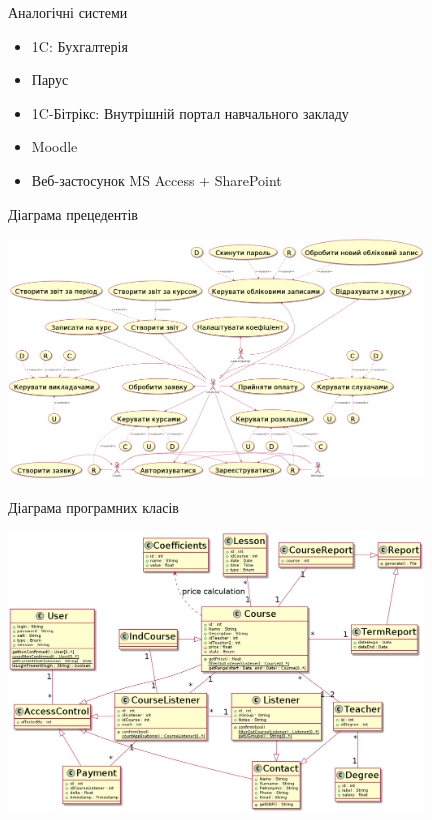 \documentclass{beamer}
\begin{document}
\begin{frame}{\fn Аналогічні системи}
\begin{itemize}
\item 1C: Бухгалтерія
\item Парус
\item 1C-Бітрікс: Внутрішній портал навчального закладу
\item Moodle
\item Веб-застосунок MS Access + SharePoint
\end{itemize}
\end{frame}
\begin{frame}{\fn Діаграма прецедентів}
\vspace{0cm}
\begin{center}
\includegraphics[width=11cm]{pp_pw1_uc_pres.png}
\end{center}
\end{frame}
\begin{frame}{\fn Діаграма програмних класів}
\begin{center}
\vspace{-3mm}
\includegraphics[width=11cm]{pp_pw3_clas_pres.png}
\end{center}
\end{frame}
\end{document}
